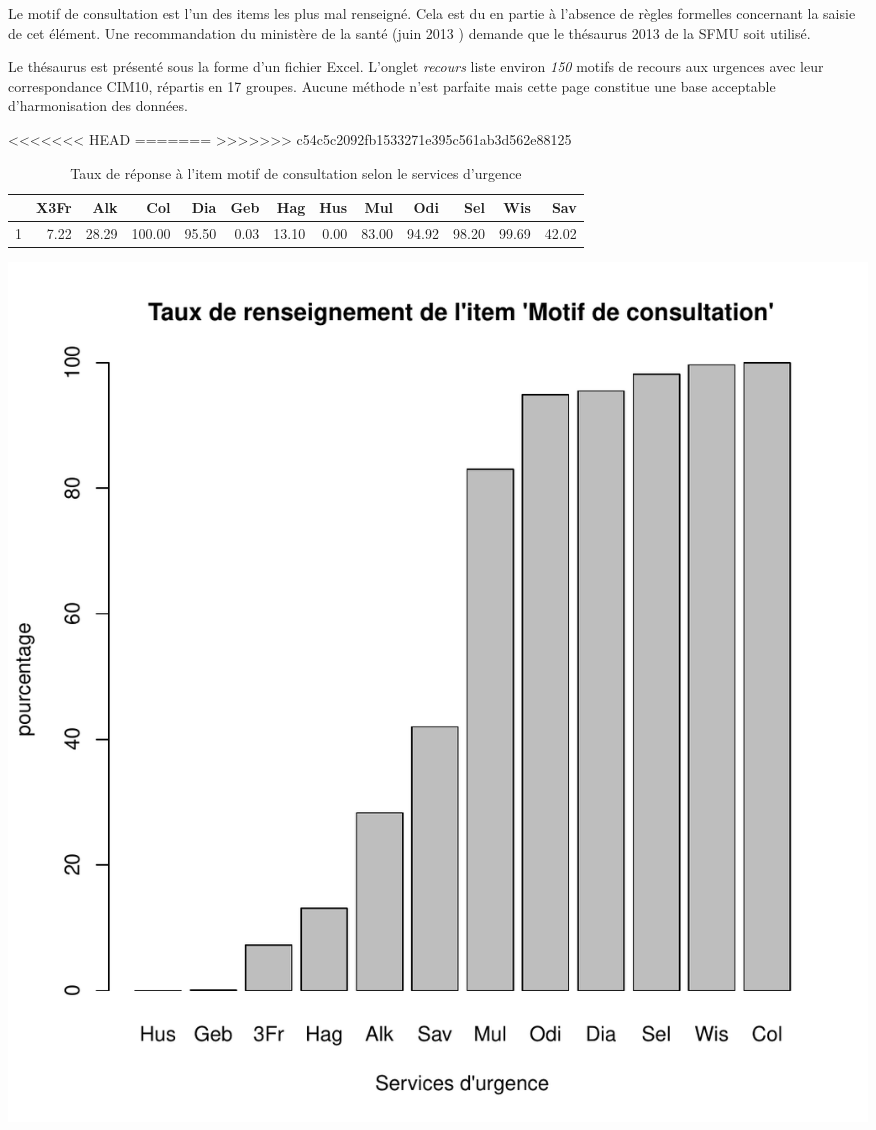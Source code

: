 \documentclass[12pt,english,french,twoside]{book}\usepackage[]{graphicx}\usepackage[]{color}
\makeatletter
\def\maxwidth{ %
  \ifdim\Gin@nat@width>\linewidth
    \linewidth
  \else
    \Gin@nat@width
  \fi
}
\makeatother
\begin{document}


Le motif de consultation est l'un des items les plus mal renseigné. Cela est du en partie à l'absence de règles formelles concernant la saisie de cet élément. Une recommandation du ministère de la santé (juin 2013 \cite{12,13}) demande que le thésaurus 2013 de la SFMU \cite{9} soit utilisé.

Le thésaurus est présenté sous la forme d'un fichier Excel. L'onglet \emph{recours} liste environ \emph{150} motifs de recours aux urgences avec leur correspondance CIM10, répartis en 17 groupes. Aucune méthode n'est parfaite mais cette page constitue une base acceptable d'harmonisation des données.


<<<<<<< HEAD
=======
>>>>>>> c54c5c2092fb1533271e395c561ab3d562e88125
\begin{table}[ht]
\centering
\begin{tabular}{rrrrrrrrrrrrr}
  \hline
 & X3Fr & Alk & Col & Dia & Geb & Hag & Hus & Mul & Odi & Sel & Wis & Sav \\ 
  \hline
1 & 7.22 & 28.29 & 100.00 & 95.50 & 0.03 & 13.10 & 0.00 & 83.00 & 94.92 & 98.20 & 99.69 & 42.02 \\ 
   \hline
\end{tabular}
\caption[motif de consultation]{Taux de réponse à l'item motif de consultation selon le services d'urgence} 
\label{lab:motif}
\end{table}

\includegraphics[width=\maxwidth]{figure/motifss1} 
\end{document}
